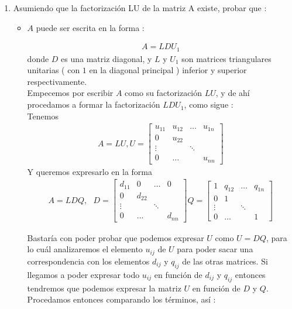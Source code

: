 \documentclass{article}
\begin{document}
\begin{enumerate}


\item Asumiendo que la factorizaci\'on LU de la matriz A existe, probar que :
\begin{itemize}
\item $A$ puede ser escrita en la forma :

\begin{gather*}
A = L D U_{1}
\end{gather*}
donde $D$ es una matriz diagonal, y $L$ y $U_{1}$ son matrices triangulares unitarias ( con $1$ en la diagonal principal ) inferior y superior respectivamente.\\


Empecemos por escribir $A$ como su factorizaci\'on $LU$, y de ahí procedamos a formar la factorizaci\'on $LDU_{1}$, como sigue : \\

Tenemos
\begin{gather*}
A = LU, U = 
\begin{bmatrix}
	u_{11}  & u_{12} & \hdots & u_{1n} \\
	   0    & u_{22} \\
	 \vdots && \ddots \\
	   0    & \hdots && u_{nn}
\end{bmatrix}
\end{gather*}
Y queremos expresarlo en la forma
\begin{gather*}
A = LDQ,\textit{ } D = 
	\begin{bmatrix}
		d_{11}  & 	0	 & \hdots & 0 \\
		   0    & d_{22} \\
		 \vdots && \ddots \\
		   0    & \hdots && d_{nn}		   
	\end{bmatrix}
Q = 
	\begin{bmatrix}
		   1    & q_{12} & \hdots & q_{1n} \\
		   0    &    1    \\
		 \vdots && \ddots \\
		   0    & \hdots && 1
	\end{bmatrix}
\end{gather*}

Bastaría con poder probar que podemos expresar $U$ como $U = DQ$, para lo cu\'al analizaremos el elemento $u_{ij}$ de $U$ para poder sacar una correspondencia con los elementos $d_{ij}$ y $q_{ij}$ de las otras matrices. Si llegamos a poder expresar todo $u_{ij}$ en funci\'on de $d_{ij}$ y $q_{ij}$ entonces tendremos que podemos expresar la matriz $U$ en funci\'on de $D$ y $Q$. Procedamos entonces comparando los t\'erminos, as\'i :


\end{itemize}
\end{enumerate}
\end{document}
